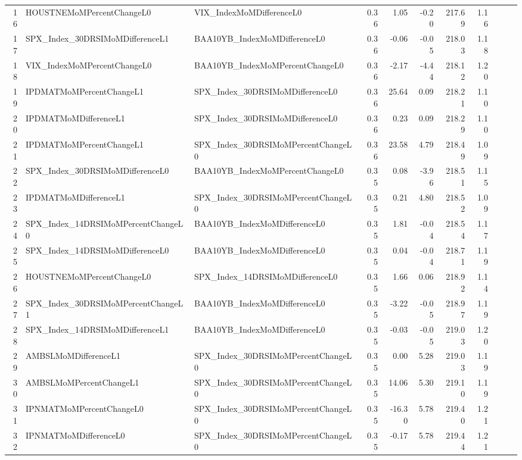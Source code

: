 \begin{longtable}{rllrrrrrlll}
  16 & HOUSTNEMoMPercentChangeL0 & VIX\_IndexMoMDifferenceL0 & 0.36 & 1.05 & -0.20 & 217.69 & 1.16 &  &  &  \\ 
  17 & SPX\_Index\_30DRSIMoMDifferenceL1 & BAA10YB\_IndexMoMDifferenceL0 & 0.36 & -0.06 & -0.05 & 218.03 & 1.18 &  &  &  \\ 
  18 & VIX\_IndexMoMPercentChangeL0 & BAA10YB\_IndexMoMPercentChangeL0 & 0.36 & -2.17 & -4.44 & 218.12 & 1.20 &  &  &  \\ 
  19 & IPDMATMoMPercentChangeL1 & SPX\_Index\_30DRSIMoMDifferenceL0 & 0.36 & 25.64 & 0.09 & 218.21 & 1.10 &  &  &  \\ 
  20 & IPDMATMoMDifferenceL1 & SPX\_Index\_30DRSIMoMDifferenceL0 & 0.36 & 0.23 & 0.09 & 218.29 & 1.10 &  &  &  \\ 
  21 & IPDMATMoMPercentChangeL1 & SPX\_Index\_30DRSIMoMPercentChangeL0 & 0.36 & 23.58 & 4.79 & 218.49 & 1.09 &  &  &  \\ 
  22 & SPX\_Index\_30DRSIMoMDifferenceL0 & BAA10YB\_IndexMoMPercentChangeL0 & 0.35 & 0.08 & -3.96 & 218.51 & 1.15 &  &  &  \\ 
  23 & IPDMATMoMDifferenceL1 & SPX\_Index\_30DRSIMoMPercentChangeL0 & 0.35 & 0.21 & 4.80 & 218.52 & 1.09 &  &  &  \\ 
  24 & SPX\_Index\_14DRSIMoMPercentChangeL0 & BAA10YB\_IndexMoMDifferenceL0 & 0.35 & 1.81 & -0.04 & 218.54 & 1.17 &  &  &  \\ 
  25 & SPX\_Index\_14DRSIMoMDifferenceL0 & BAA10YB\_IndexMoMDifferenceL0 & 0.35 & 0.04 & -0.04 & 218.71 & 1.19 &  &  &  \\ 
  26 & HOUSTNEMoMPercentChangeL0 & SPX\_Index\_14DRSIMoMDifferenceL0 & 0.35 & 1.66 & 0.06 & 218.92 & 1.14 &  &  &  \\ 
  27 & SPX\_Index\_30DRSIMoMPercentChangeL1 & BAA10YB\_IndexMoMDifferenceL0 & 0.35 & -3.22 & -0.05 & 218.97 & 1.19 &  &  &  \\ 
  28 & SPX\_Index\_14DRSIMoMDifferenceL1 & BAA10YB\_IndexMoMDifferenceL0 & 0.35 & -0.03 & -0.05 & 219.03 & 1.20 &  &  &  \\ 
  29 & AMBSLMoMDifferenceL1 & SPX\_Index\_30DRSIMoMPercentChangeL0 & 0.35 & 0.00 & 5.28 & 219.03 & 1.19 &  &  &  \\ 
  30 & AMBSLMoMPercentChangeL1 & SPX\_Index\_30DRSIMoMPercentChangeL0 & 0.35 & 14.06 & 5.30 & 219.10 & 1.19 &  &  &  \\ 
  31 & IPNMATMoMPercentChangeL0 & SPX\_Index\_30DRSIMoMPercentChangeL0 & 0.35 & -16.30 & 5.78 & 219.40 & 1.21 &  &  &  \\ 
  32 & IPNMATMoMDifferenceL0 & SPX\_Index\_30DRSIMoMPercentChangeL0 & 0.35 & -0.17 & 5.78 & 219.44 & 1.21 &  &  &  \\ 

\end{longtable}
